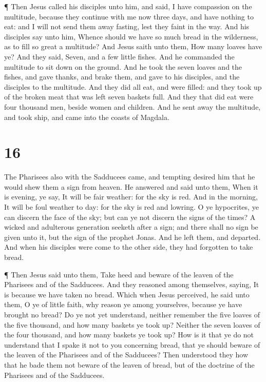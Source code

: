  ¶ Then Jesus called his disciples unto him, and said, I
have compassion on the multitude, because they continue with me now
three days, and have nothing to eat: and I will not send them away
fasting, lest they faint in the way.  And his disciples say
unto him, Whence should we have so much bread in the wilderness, as to
fill so great a multitude?  And Jesus saith unto them, How
many loaves have ye? And they said, Seven, and a few little fishes.
 And he commanded the multitude to sit down on the ground.
 And he took the seven loaves and the fishes, and gave
thanks, and brake them, and gave to his disciples, and the disciples to
the multitude.  And they did all eat, and were filled: and
they took up of the broken meat that was left seven baskets full.
 And they that did eat were four thousand men, beside women
and children.  And he sent away the multitude, and took
ship, and came into the coasts of Magdala.

\hypertarget{section-15}{%
\section{16}\label{section-15}}

 The Pharisees also with the Sadducees came, and tempting
desired him that he would shew them a sign from heaven.  He
answered and said unto them, When it is evening, ye say, It will be fair
weather: for the sky is red.  And in the morning, It will be
foul weather to day: for the sky is red and lowring. O ye hypocrites, ye
can discern the face of the sky; but can ye not discern the signs of the
times?  A wicked and adulterous generation seeketh after a
sign; and there shall no sign be given unto it, but the sign of the
prophet Jonas. And he left them, and departed.  And when his
disciples were come to the other side, they had forgotten to take bread.

 ¶ Then Jesus said unto them, Take heed and beware of the
leaven of the Pharisees and of the Sadducees.  And they
reasoned among themselves, saying, It is because we have taken no bread.
 Which when Jesus perceived, he said unto them, O ye of
little faith, why reason ye among yourselves, because ye have brought no
bread?  Do ye not yet understand, neither remember the five
loaves of the five thousand, and how many baskets ye took up?
 Neither the seven loaves of the four thousand, and how
many baskets ye took up?  How is it that ye do not
understand that I spake it not to you concerning bread, that ye should
beware of the leaven of the Pharisees and of the Sadducees?
 Then understood they how that he bade them not beware of
the leaven of bread, but of the doctrine of the Pharisees and of the
Sadducees.

